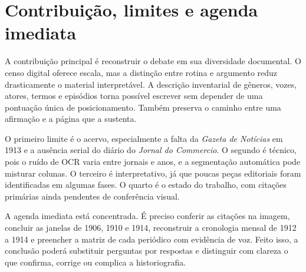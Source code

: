 \section{Contribuição, limites e agenda imediata}

A contribuição principal é reconstruir o debate em sua diversidade documental. O censo digital oferece escala, mas a distinção entre rotina e argumento reduz drasticamente o material interpretável. A descrição inventarial de gêneros, vozes, atores, termos e episódios torna possível escrever sem depender de uma pontuação única de posicionamento. Também preserva o caminho entre uma afirmação e a página que a sustenta.

O primeiro limite é o acervo, especialmente a falta da \textit{Gazeta de Notícias} em 1913 e a ausência serial do diário do \textit{Jornal do Commercio}. O segundo é técnico, pois o ruído de OCR varia entre jornais e anos, e a segmentação automática pode misturar colunas. O terceiro é interpretativo, já que poucas peças editoriais foram identificadas em algumas fases. O quarto é o estado do trabalho, com citações primárias ainda pendentes de conferência visual.


A agenda imediata está concentrada. É preciso conferir as citações na imagem, concluir as janelas de 1906, 1910 e 1914, reconstruir a cronologia mensal de 1912 a 1914 e preencher a matriz de cada periódico com evidência de voz. Feito isso, a conclusão poderá substituir perguntas por respostas e distinguir com clareza o que confirma, corrige ou complica a historiografia.
